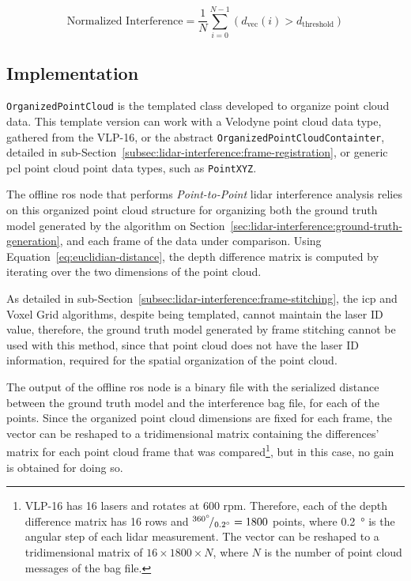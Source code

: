 \begin{equation}
\label{eq:normalized-interference-depth}
\displaystyle
\text{Normalized Interference} = \frac{1}{N} \sum\limits^{N-1}_{i = 0} \left(d_{\text{vec}}(i)
> d_\text{threshold}\right)
\end{equation}

\subsection{Implementation}
\texttt{OrganizedPointCloud} is the templated class developed to organize point cloud data. This template version can work with a Velodyne point cloud data type, gathered from the VLP-16, or the abstract \texttt{OrganizedPointCloudContainter}, detailed in sub-Section~\ref{subsec:lidar-interference:frame-registration}, or generic \ac{pcl} point cloud point data types, such as \texttt{PointXYZ}.

The offline \ac{ros} node that performs \textit{Point-to-Point} \ac{lidar} interference analysis relies on this organized point cloud structure for organizing both the ground truth model generated by the algorithm on Section~\ref{sec:lidar-interference:ground-truth-generation}, and each frame of the data under comparison. Using Equation~\eqref{eq:euclidian-distance}, the depth difference matrix is computed by iterating over the two dimensions of the point cloud. 

As detailed in sub-Section~\ref{subsec:lidar-interference:frame-stitching}, the \ac{icp} and Voxel Grid algorithms, despite being templated, cannot maintain the \ac{laser} ID value, therefore, the ground truth model generated by frame stitching cannot be used with this method, since that point cloud does not have the \ac{laser} ID information, required for the spatial organization of the point cloud.

The output of the offline \ac{ros} node is a binary file with the serialized distance between the ground truth model and the interference bag file, for each of the points. Since the organized point cloud dimensions are fixed for each frame, the vector can be reshaped to a tridimensional matrix containing the differences' matrix for each point cloud frame that was compared\footnote{VLP-16 has 16 lasers and rotates at 600 \ac{rpm}. Therefore, each of the depth difference matrix has 16 rows and ${}^{\SI{360}{\degree}}\!/_{\SI{0.2}{\degree}} = 1800$ points, where \SI{0.2}{\degree} is the angular step of each \ac{lidar} measurement. The vector can be reshaped to a tridimensional matrix of $16\times 1800\times N$, where $N$ is the number of point cloud messages of the bag file.}, but in this case, no gain is obtained for doing so.

